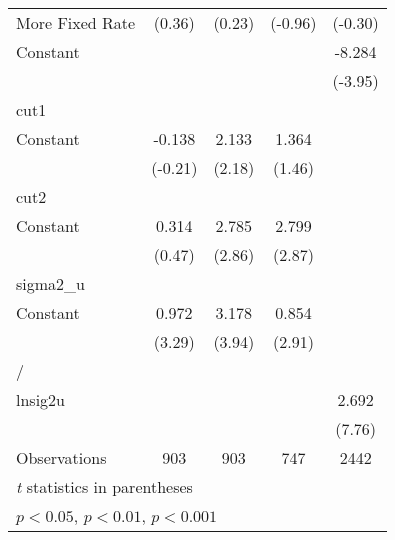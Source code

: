 {\begin{tabular}{l*{4}{c}}
More Fixed Rate     &      (0.36)         &      (0.23)         &     (-0.96)         &     (-0.30)         \\
[1em]
Constant            &                     &                     &                     &      -8.284\sym{***}\\
                    &                     &                     &                     &     (-3.95)         \\
\hline
cut1                &                     &                     &                     &                     \\
Constant            &      -0.138         &       2.133\sym{*}  &       1.364         &                     \\
                    &     (-0.21)         &      (2.18)         &      (1.46)         &                     \\
\hline
cut2                &                     &                     &                     &                     \\
Constant            &       0.314         &       2.785\sym{**} &       2.799\sym{**} &                     \\
                    &      (0.47)         &      (2.86)         &      (2.87)         &                     \\
\hline
sigma2\_u            &                     &                     &                     &                     \\
Constant            &       0.972\sym{***}&       3.178\sym{***}&       0.854\sym{**} &                     \\
                    &      (3.29)         &      (3.94)         &      (2.91)         &                     \\
\hline
/                   &                     &                     &                     &                     \\
lnsig2u             &                     &                     &                     &       2.692\sym{***}\\
                    &                     &                     &                     &      (7.76)         \\
\hline
Observations        &         903         &         903         &         747         &        2442         \\
\hline\hline
\multicolumn{5}{l}{\footnotesize \textit{t} statistics in parentheses}\\
\multicolumn{5}{l}{\footnotesize \sym{*} \(p<0.05\), \sym{**} \(p<0.01\), \sym{***} \(p<0.001\)}\\
\end{tabular}
}
